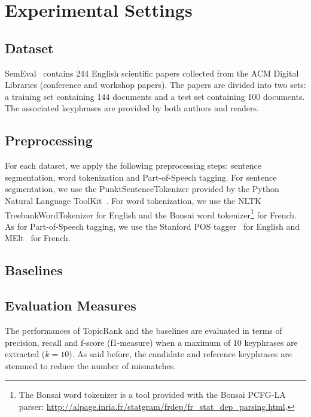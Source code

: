 \section{Experimental Settings}
\label{sec:experimental_settings}
  \subsection{Dataset}
  \label{subsec:dataset}

    SemEval~\cite{kim2010semeval} contains 244 English scientific papers
    collected from the ACM Digital Libraries (conference and workshop papers).
    The papers are divided into two sets: a training set containing 144
    documents and a test set containing 100 documents. The associated keyphrases
    are provided by both authors and readers.

  \subsection{Preprocessing}
  \label{subsec:preprocessing}
    For each dataset, we apply the following preprocessing steps: sentence
    segmentation, word tokenization and Part-of-Speech tagging. For sentence
    segmentation, we use the PunktSentenceTokenizer provided by the Python
    Natural Language ToolKit~\cite[NLTK]{bird2009nltk}. For word tokenization,
    we use the NLTK TreebankWordTokenizer for English and the Bonsai word
    tokenizer\footnote{The Bonsai word tokenizer is a tool provided with the
    Bonsai PCFG-LA parser:
    \url{http://alpage.inria.fr/statgram/frdep/fr_stat_dep_parsing.html}.} for
    French. As for Part-of-Speech tagging, we use the Stanford POS
    tagger~\cite{toutanova2003stanfordpostagger} for English and
    MElt~\cite{denis2009melt} for French.

  \subsection{Baselines}
  \label{subsec:baselines}

  \subsection{Evaluation Measures}
  \label{subsec:evaluation_measures}
    The performances of TopicRank and the baselines are evaluated in terms of
    precision, recall and f-score (f1-measure) when a maximum of 10 keyphrases
    are extracted ($k = 10$). As said before, the candidate and reference
    keyphrases are stemmed to reduce the number of mismatches.


